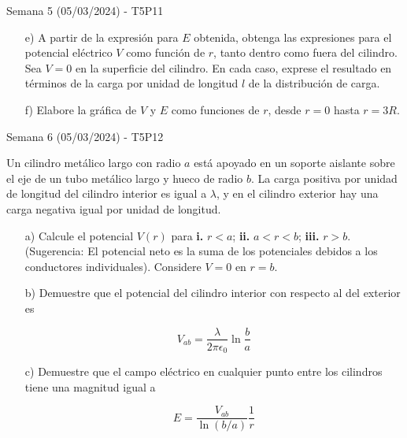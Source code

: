 \begin{frame}{Semana 5 (05/03/2024) - T5P11}
    \begin{itemize}
    
        \item[e)] A partir de la expresión para $E$ obtenida, obtenga las expresiones para el potencial eléctrico $V$ como
función de $r$, tanto dentro como fuera del cilindro. Sea $V = 0$ en la superficie del cilindro. En cada caso, exprese el resultado en términos de la
carga por unidad de longitud $l$ de la distribución de carga.
\item[f)] Elabore 
la gráfica de $V$ y $E$ como funciones de $r$, desde $r = 0$ hasta $r = 3R$.
    \end{itemize}
\end{frame}

\begin{frame}{Semana 6 (05/03/2024) - T5P12}

\small

Un cilindro metálico largo con
radio $a$ está apoyado en un soporte aislante sobre el eje de un tubo
metálico largo y hueco de radio $b$. La carga positiva por unidad de longitud del cilindro interior es igual a $\lambda$, y en el cilindro exterior hay una
carga negativa igual por unidad de longitud.
\begin{itemize}
    \item[a)] Calcule el potencial
$V(r)$ para \textbf{i.} $r < a$; \textbf{ii.} $a< r < b$; \textbf{iii.} $r > b$. (Sugerencia: El potencial neto
es la suma de los potenciales debidos a los conductores individuales).
Considere $V = 0$ en $r = b$.

\item[b)] Demuestre que el potencial del cilindro
interior con respecto al del exterior es

$$ V_{ab} = \frac{\lambda}{2\pi\epsilon_0} \ln\frac{b}{a}$$

\item[c)] Demuestre
que el campo eléctrico en cualquier punto entre los cilindros tiene una
magnitud igual a

$$ E = \frac{V_{ab}}{\ln(b/a)}\frac{1}{r} $$


\end{itemize}


\end{frame}

